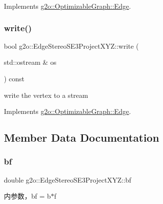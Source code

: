 Implements \mbox{\hyperlink{classg2o_1_1_optimizable_graph_1_1_edge_a30cf69b762a06aa35e796d8af71632b0}{g2o\+::\+Optimizable\+Graph\+::\+Edge}}.

\mbox{\label{classg2o_1_1_edge_stereo_s_e3_project_x_y_z_ad6d441e7c5858b4efa8392f9ed96b2bf}} 
\subsubsection{\texorpdfstring{write()}{write()}}
{\footnotesize\ttfamily bool g2o\+::\+Edge\+Stereo\+S\+E3\+Project\+X\+Y\+Z\+::write (\begin{DoxyParamCaption}\item[{std\+::ostream \&}]{os }\end{DoxyParamCaption}) const\hspace{0.3cm}{\ttfamily [virtual]}}



write the vertex to a stream 



Implements \mbox{\hyperlink{classg2o_1_1_optimizable_graph_1_1_edge_a804b9a2178249b9297c55b8fbbeda56e}{g2o\+::\+Optimizable\+Graph\+::\+Edge}}.



\subsection{Member Data Documentation}
\mbox{\label{classg2o_1_1_edge_stereo_s_e3_project_x_y_z_afc94291834aa40d18205e61ac802cbfc}} 
\subsubsection{\texorpdfstring{bf}{bf}}
{\footnotesize\ttfamily double g2o\+::\+Edge\+Stereo\+S\+E3\+Project\+X\+Y\+Z\+::bf}



内参数，bf = b$\ast$f 


